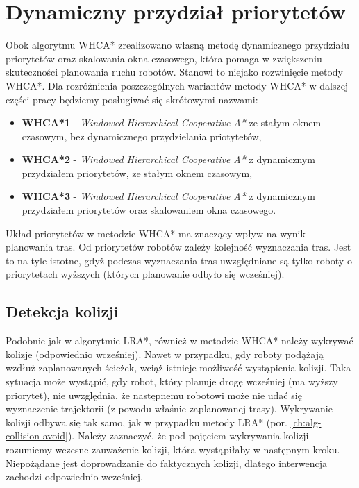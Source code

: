 \section{Dynamiczny przydział priorytetów}
\label{ch:alg-priorities-allocation}
Obok algorytmu WHCA* zrealizowano własną metodę dynamicznego przydziału priorytetów oraz skalowania okna czasowego, która pomaga w zwiększeniu skuteczności planowania ruchu robotów. Stanowi to niejako rozwinięcie metody WHCA*.
Dla rozróżnienia poszczególnych wariantów metody WHCA* w dalszej części pracy będziemy posługiwać się skrótowymi nazwami:
\begin{itemize}
	\item {\bf WHCA*1} - {\it Windowed Hierarchical Cooperative A*} ze stałym oknem czasowym, bez dynamicznego przydzielania priotytetów,
	\item {\bf WHCA*2} - {\it Windowed Hierarchical Cooperative A*} z dynamicznym przydziałem priorytetów, ze stałym oknem czasowym,
	\item {\bf WHCA*3} - {\it Windowed Hierarchical Cooperative A*} z dynamicznym przydziałem priorytetów oraz skalowaniem okna czasowego.
\end{itemize}

Układ priorytetów w metodzie WHCA* ma znaczący wpływ na wynik planowania tras. Od priorytetów robotów zależy kolejność wyznaczania tras.
Jest to na tyle istotne, gdyż podczas wyznaczania tras uwzględniane są tylko roboty o priorytetach wyższych (których planowanie odbyło się wcześniej).

\subsection{Detekcja kolizji}
Podobnie jak w algorytmie LRA*, również w metodzie WHCA* należy wykrywać kolizje (odpowiednio wcześniej).
Nawet w przypadku, gdy roboty podążają wzdłuż zaplanowanych ścieżek, wciąż istnieje możliwość wystąpienia kolizji.
Taka sytuacja może wystąpić, gdy robot, który planuje drogę wcześniej (ma wyższy priorytet), nie uwzględnia, że następnemu robotowi może nie udać się wyznaczenie trajektorii (z powodu właśnie zaplanowanej trasy).
Wykrywanie kolizji odbywa się tak samo, jak w przypadku metody LRA* (por. \ref{ch:alg-collision-avoid}).
Należy zaznaczyć, że pod pojęciem wykrywania kolizji rozumiemy wczesne zauważenie kolizji, która wystąpiłaby w następnym kroku. Niepożądane jest doprowadzanie do faktycznych kolizji, dlatego interwencja zachodzi odpowiednio wcześniej.


